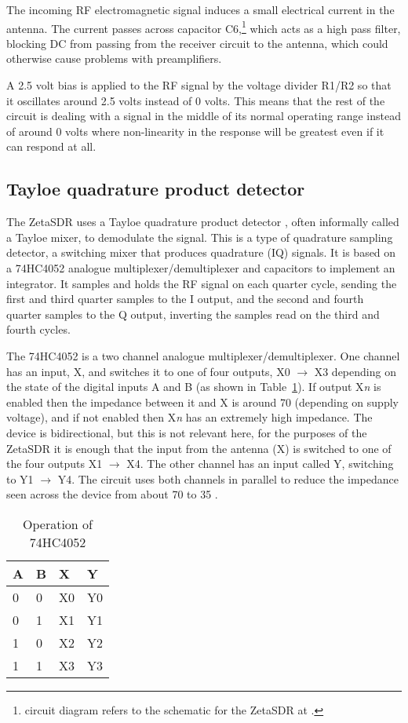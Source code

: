 \documentclass[11pt, twoside]{article}
\begin{document}
The incoming RF electromagnetic signal induces a small electrical
current in the antenna.  The current passes across capacitor
C6,\footnote{circuit diagram refers to the schematic for the ZetaSDR
  at \cite{ly1gp:2007}.} which acts as a high pass filter, blocking DC
from passing from the receiver circuit to the antenna, which could
otherwise cause problems with preamplifiers.

A 2.5 volt bias is applied to the RF signal by the voltage divider
R1/R2 so that it oscillates around 2.5 volts instead of 0 volts.  This
means that the rest of the circuit is dealing with a signal in the
middle of its normal operating range instead of around 0 volts where
non-linearity in the response will be greatest even if it can respond
at all.

\subsection{Tayloe quadrature product detector}

The ZetaSDR uses a Tayloe quadrature product detector
\citep{Tayloe:2001, Tayloe:2013}, often informally called a Tayloe
mixer, to demodulate the signal.  This is a type of quadrature
sampling detector, a switching mixer that produces quadrature (IQ)
signals. It is based on a 74HC4052 analogue multiplexer/demultiplexer
and capacitors to implement an integrator.  It samples and holds the
RF signal on each quarter cycle, sending the first and third quarter
samples to the I output, and the second and fourth quarter samples to
the Q output, inverting the samples read on the third and fourth
cycles.

The 74HC4052 is a two channel analogue multiplexer/demultiplexer.  One
channel has an input, X, and switches it to one of four outputs, X0
$\rightarrow$ X3 depending on the state of the digital inputs A and B
(as shown in Table~\ref{table:74HC4052}).  If output X{\it n} is
enabled then the impedance between it and X is around 70 {\ohm}
(depending on supply voltage), and if not enabled then X{\it n} has an
extremely high impedance.  The device is bidirectional, but this is
not relevant here, for the purposes of the ZetaSDR it is enough that
the input from the antenna (X) is switched to one of the four outputs
X1 $\rightarrow$ X4. The other channel has an input called Y,
switching to Y1 $\rightarrow$ Y4.  The circuit uses both channels in
parallel to reduce the impedance seen across the device from about 70
{\ohm} to 35 {\ohm}.

\begin{table}[ht]
  \center
  \begin{tabular}{|l| l| l| l|}
    \hline
    A & B & X & Y  \\
    \hline
    \hline
    0 &0& X0& Y0\\
    0 &1& X1& Y1\\
    1 &0& X2& Y2\\
    1 &1& X3& Y3\\
    \hline
  \end{tabular}
  \caption{Operation of 74HC4052}
  \label{table:74HC4052}
\end{table}
\end{document}
